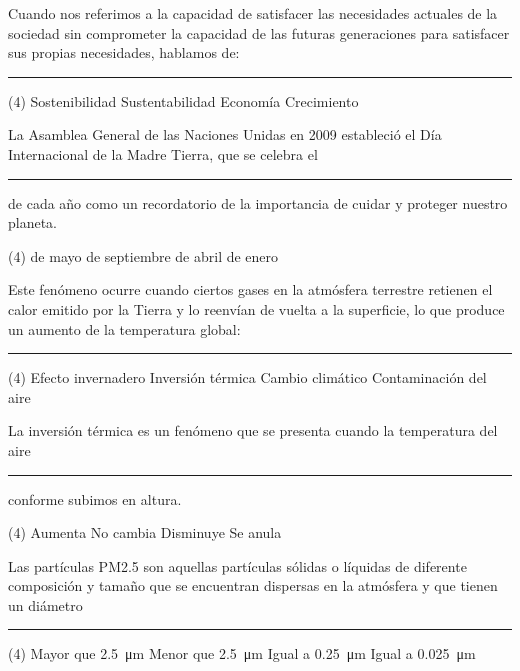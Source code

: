 \documentclass[12pt, letter]{exam}
\begin{document}
\begin{questions}
    \question Cuando nos referimos a la capacidad de satisfacer las necesidades actuales de la sociedad sin comprometer la capacidad de las futuras generaciones para satisfacer sus propias necesidades, hablamos de: \rule{2cm}{0.1mm}
    \begin{tasks}(4)
        \task Sostenibilidad
        \task Sustentabilidad
        \task Economía
        \task Crecimiento
    \end{tasks}
    \question La Asamblea General de las Naciones Unidas en 2009 estableció el Día Internacional de la Madre Tierra, que se celebra el \rule{2cm}{0.1mm} de cada año como un recordatorio de la importancia de cuidar y proteger nuestro planeta.
    \begin{tasks}(4)
         de mayo
         de septiembre
         de abril
         de enero
    \end{tasks}
    \question Este fenómeno ocurre cuando ciertos gases en la atmósfera terrestre retienen el calor emitido por la Tierra y lo reenvían de vuelta a la superficie, lo que produce un aumento de la temperatura global: \rule{2cm}{0.1mm}
    \begin{tasks}(4)
        \task Efecto invernadero
        \task Inversión térmica
        \task Cambio climático
        \task Contaminación del aire
    \end{tasks}
    \question La inversión térmica es un fenómeno que se presenta cuando la temperatura del aire \rule{2cm}{0.1mm} conforme subimos en altura.
    \begin{tasks}(4)
        \task Aumenta
        \task No cambia
        \task Disminuye
        \task Se anula
    \end{tasks}
    \question Las partículas PM2.5 son aquellas partículas sólidas o líquidas de diferente composición y tamaño que se encuentran dispersas en la atmósfera y que tienen un diámetro \rule{2cm}{0.1mm}
    \begin{tasks}(4)
        \task Mayor que \SI{2.5}{\micro\meter}
        \task Menor que \SI{2.5}{\micro\meter}
        \task Igual a \SI{0.25}{\micro\meter}
        \task Igual a \SI{0.025}{\micro\meter}
    \end{tasks}

\end{questions}
\end{document}

